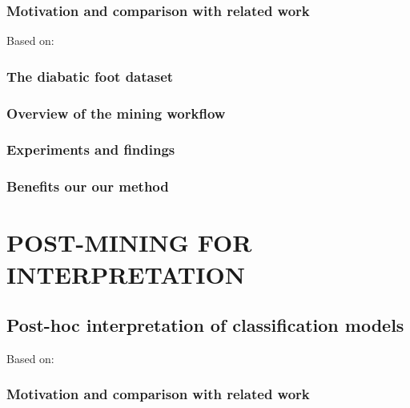 \documentclass[
]{book}
\begin{document}
\hypertarget{motivation-and-comparison-with-related-work-3}{%
\section{Motivation and comparison with related work}\label{motivation-and-comparison-with-related-work-3}}

Based on: \autocite{Niemann:CBMS2016,Niemann:PONE2016,Niemann:EBioMedicine2020}

\hypertarget{the-diabatic-foot-dataset}{%
\section{The diabatic foot dataset}\label{the-diabatic-foot-dataset}}

\hypertarget{overview-of-the-mining-workflow-1}{%
\section{Overview of the mining workflow}\label{overview-of-the-mining-workflow-1}}

\hypertarget{experiments-and-findings-3}{%
\section{Experiments and findings}\label{experiments-and-findings-3}}

\hypertarget{benefits-our-our-method-2}{%
\section{Benefits our our method}\label{benefits-our-our-method-2}}

\hypertarget{part-post-mining-for-interpretation}{%
\part{POST-MINING FOR INTERPRETATION}\label{part-post-mining-for-interpretation}}

\hypertarget{iml}{%
\chapter{Post-hoc interpretation of classification models}\label{iml}}

Based on: \autocite{Niemann:CBMS2018,Niemann:SREP2020,Niemann:PONE2020,Niemann:Frontiers2020}

\hypertarget{motivation-and-comparison-with-related-work-4}{%
\section{Motivation and comparison with related work}\label{motivation-and-comparison-with-related-work-4}}
\end{document}
